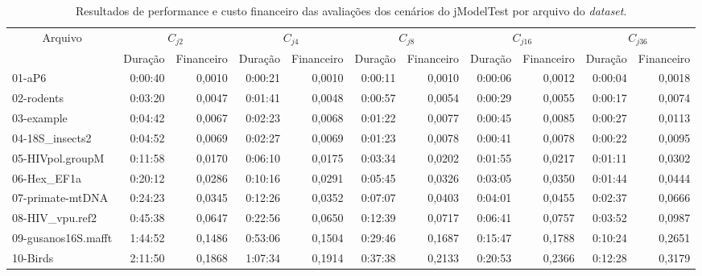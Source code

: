 \documentclass[english,brazilian]{UNISINOSmonografia} %
\renewcommand{\arraystretch}{1.3}
\begin{document}
{\begin{landscape}
		
		
		
		\begin{table}
			\centering%
			\begin{minipage}{1.1\linewidth}
				\caption{Resultados de performance e custo financeiro das avaliações dos cenários do jModelTest por arquivo do \textit{dataset}.}
				\label{tab:results-custos-jmodeltest}
				\vspace{0.75ex}
				\renewcommand\arraystretch{1.4}
				\begin{tabular*}{\linewidth}{@{\extracolsep{\fill}}lrrrrrrrrrr@{}}
					\toprule
					\multicolumn{1}{c}{\multirow{2}{*}{Arquivo}} & \multicolumn{2}{c}{$C_{j2}$} & \multicolumn{2}{c}{$C_{j4}$} & \multicolumn{2}{c}{$C_{j8}$} & \multicolumn{2}{c}{$C_{j16}$} & \multicolumn{2}{c}{$C_{j36}$} \\
					\cmidrule(r){2-3}
					\cmidrule(lr){4-5}
					\cmidrule(lr){6-7}
					\cmidrule(lr){8-9}
					\cmidrule(l){10-11}
					\multicolumn{1}{c}{} & Duração & Financeiro & Duração & Financeiro & Duração & Financeiro & Duração & Financeiro & Duração & Financeiro \\
					\midrule
					01-aP6 & 0:00:40 & 0,0010 & 0:00:21 & 0,0010 & 0:00:11 & 0,0010 & 0:00:06 & 0,0012 & 0:00:04 & 0,0018 \\
					02-rodents & 0:03:20 & 0,0047 & 0:01:41 & 0,0048 & 0:00:57 & 0,0054 & 0:00:29 & 0,0055 & 0:00:17 & 0,0074 \\
					03-example & 0:04:42 & 0,0067 & 0:02:23 & 0,0068 & 0:01:22 & 0,0077 & 0:00:45 & 0,0085 & 0:00:27 & 0,0113 \\
					04-18S\_insects2 & 0:04:52 & 0,0069 & 0:02:27 & 0,0069 & 0:01:23 & 0,0078 & 0:00:41 & 0,0078 & 0:00:22 & 0,0095 \\
					05-HIVpol.groupM & 0:11:58 & 0,0170 & 0:06:10 & 0,0175 & 0:03:34 & 0,0202 & 0:01:55 & 0,0217 & 0:01:11 & 0,0302 \\
					06-Hex\_EF1a & 0:20:12 & 0,0286 & 0:10:16 & 0,0291 & 0:05:45 & 0,0326 & 0:03:05 & 0,0350 & 0:01:44 & 0,0444 \\
					07-primate-mtDNA & 0:24:23 & 0,0345 & 0:12:26 & 0,0352 & 0:07:07 & 0,0403 & 0:04:01 & 0,0455 & 0:02:37 & 0,0666 \\
					08-HIV\_vpu.ref2 & 0:45:38 & 0,0647 & 0:22:56 & 0,0650 & 0:12:39 & 0,0717 & 0:06:41 & 0,0757 & 0:03:52 & 0,0987 \\
					09-gusanos16S.mafft & 1:44:52 & 0,1486 & 0:53:06 & 0,1504 & 0:29:46 & 0,1687 & 0:15:47 & 0,1788 & 0:10:24 & 0,2651 \\
					10-Birds & 2:11:50 & 0,1868 & 1:07:34 & 0,1914 & 0:37:38 & 0,2133 & 0:20:53 & 0,2366 & 0:12:28 & 0,3179 \\

\end{tabular*}
\end{minipage}
\end{table}
\end{landscape}}
\end{document}
